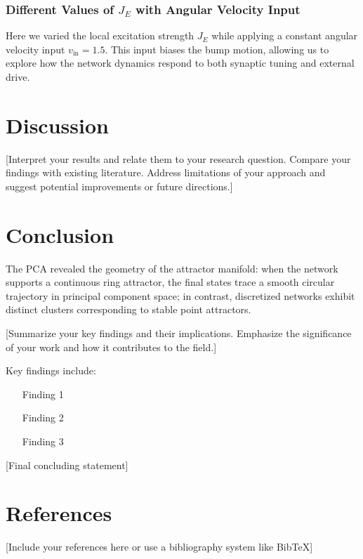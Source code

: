 \documentclass[11pt,a4paper]{article}
\begin{document}
\subsubsection*{Different Values of \( J_E \) with Angular Velocity Input}
Here we varied the local excitation strength \( J_E \) while applying a constant angular velocity input \( v_{\text{in}} = 1.5 \). 
This input biases the bump motion, allowing us to explore how the network dynamics respond to both synaptic tuning and external drive.


\section{Discussion}

[Interpret your results and relate them to your research question. Compare your findings with existing literature. Address limitations of your approach and suggest potential improvements or future directions.]

\section*{Conclusion}

The PCA revealed the geometry of the attractor manifold: when the network supports a continuous ring attractor, the final states trace a smooth circular trajectory in principal component space; in contrast, discretized networks exhibit distinct clusters corresponding to stable point attractors. 


[Summarize your key findings and their implications. Emphasize the significance of your work and how it contributes to the field.]

Key findings include:
\begin{itemize}
\item [Finding 1]
\item [Finding 2]
\item [Finding 3]
\end{itemize}

[Final concluding statement]

\section*{References}

[Include your references here or use a bibliography system like BibTeX]
\end{document}
